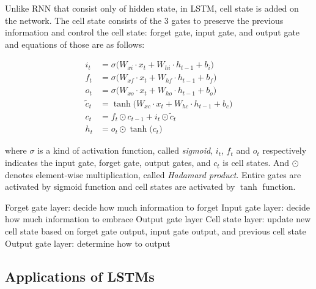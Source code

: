 \documentclass{ieeeaccess}
\begin{document}
Unlike RNN that consist only of hidden state, in LSTM, cell state is added on the network. The cell state consists of the 3 gates to preserve the previous information and control the cell state: forget gate, input gate, and output gate and equations of those are as follows:

\begin{align}
i_{t} & =\sigma\big(W_{xi}\cdot x_{t}+W_{hi}\cdot h_{t-1}+b_{i}\big)\\
f_{t} & =\sigma\big(W_{xf}\cdot x_{t}+W_{hf}\cdot h_{t-1}+b_{f}\big)\\
o_{t} & =\sigma\big(W_{xo}\cdot x_{t}+W_{ho}\cdot h_{t-1}+b_{o}\big)\\
\tilde{c}_{t} & = \tanh\big(W_{xc}\cdot x_{t}+W_{hc}\cdot h_{t-1}+b_{c}\big)\\
c_{t} & =f_{t}\odot c_{t-1}+i_{t}\odot\tilde{c}_{t}\\
h_{t} & =o_{t}\odot \tanh\big(c_{t}\big)
\end{align}

where $\sigma$ is a kind of activation function, called \textit{sigmoid}, $i_{t}$, $f_{t}$ and $o_{t}$ respectively indicates the input gate, forget gate, output gates, and $c_{t}$ is cell states. And $\odot$ denotes element-wise multiplication, called \textit{Hadamard product}. Entire gates are activated by sigmoid function and cell states are activated by $\tanh$ function.


Forget gate layer: decide how much information to forget
Input gate layer: decide how much information to embrace
Output gate layer
Cell state layer: update new cell state based on forget gate output, input gate output, and previous cell state
Output gate layer: determine how to output


\subsection{Applications of LSTMs}
\end{document}

